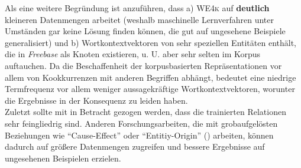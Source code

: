 Als eine weitere Begründung ist anzuführen, dass a) \textsc{WE4k} auf \textbf{deutlich} kleineren Datenmengen arbeitet (weshalb maschinelle
Lernverfahren unter Umständen gar keine Lösung finden können, die gut auf ungesehene Beispiele generalisiert) und b)
Wortkontextvektoren von sehr speziellen Entitäten enthält, die in \emph{Freebase} als Knoten existieren, u. U. aber sehr selten
im Korpus auftauchen. Da die Beschaffenheit der korpusbasierten Repräsentationen vor allem von Kookkurrenzen mit anderen
Begriffen abhängt, bedeutet eine niedrige Termfrequenz vor allem weniger aussagekräftige Wortkontextvektoren, worunter die
Ergebnisse in der Konsequenz zu leiden haben.\\

Zuletzt sollte mit in Betracht gezogen werden, dass die trainierten Relationen sehr feingliedrig sind. Anderen Forschungsarbeiten,
 die mit grobaufgelösten Beziehungen wie ``Cause-Effect'' oder ``Entitiy-Origin''
(\cite{hendrickx2009semeval}) arbeiten, können dadurch auf größere Datenmengen zugreifen und bessere Ergebnisse auf
ungesehenen Beispielen erzielen.
